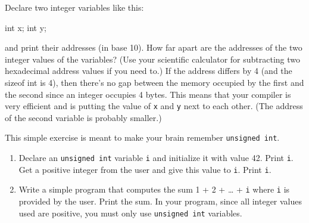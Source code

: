 \begin{ex}
Declare two integer variables like this:
\begin{consolethree}[escapeinside=||]
int x;
int y;
\end{consolethree}
and print their addresses (in base 10). How far apart are the addresses of the two integer values of the variables? (Use your scientific calculator for subtracting two hexadecimal address values if you need to.) If the address differs by 4 (and the sizeof int is 4), then there's no gap between the memory occupied by the first and the second since an integer occupies 4 bytes. This means that your compiler is very efficient and is putting the value of \texttt{x} and \texttt{y} next to each other. (The address of the second variable is probably smaller.)
\end{ex}
\begin{ex}
This simple exercise is meant to make your brain remember \texttt{unsigned int}.

\begin{enumerate}
\item
  Declare an \texttt{unsigned int} variable \texttt{i} and initialize it
  with value 42. Print \texttt{i}. Get a positive integer from the user
  and give this value to \texttt{i}. Print \texttt{i}.
\item
  Write a simple program that computes the sum 1 + 2 + \ldots{} +
  \texttt{i} where \texttt{i} is provided by the user. Print the sum. In
  your program, since all integer values used are positive, you must
  only use \texttt{unsigned int} variables.
\end{enumerate}
\end{ex}

